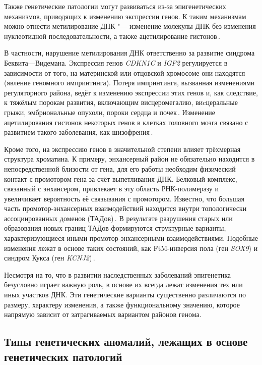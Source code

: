 \documentclass[a4paper,14pt]{extarticle}
\newcommand{\genename}[1]{\textit{#1}}
\newcommand{\ecitep}[1]{\textenglish{\citep{#1}}}
\begin{document}
Также генетические патологии могут развиваться из-за эпигенетических механизмов, приводящих к изменению экспрессии генов.
К таким механизмам можно отнести метилирование ДНК "--- изменение молекулы ДНК без изменения нуклеотидной последовательности, а также ацетилирование гистонов\,\ecitep{Handy_2011}.

В частности, нарушение метилирования ДНК ответственно за развитие синдрома Беквита---Видемана.
Экспрессия генов \genename{CDKN1C} и \genename{IGF2} регулируется в зависимости от того, на материнской или отцовской хромосоме они находятся (явление геномного импринтинга).
Потеря импринтинга, вызванная изменениями регуляторного района, ведёт к изменению экспрессии этих генов и, как следствие, к тяжёлым порокам развития, включающим висцеромегалию, виcцеральные грыжи, эмбриональные опухоли, пороки сердца и почек\,\ecitep{Jin_2018}.
Изменение ацетилирования гистонов некоторых генов в клетках головного мозга связано с развитием такого заболевания, как шизофрения\,\ecitep{Tang_2011}.

Кроме того, на экспрессию генов в значительной степени влияет трёхмерная структура хроматина.
К примеру, энхансерный район не обязательно находится в непосредственной близости от гена, для его работы необходим физический контакт с промотором гена за счёт выпетливания ДНК.
Белковый комплекс, связанный с энхансером, привлекает в эту область РНК-полимеразу и увеличивает вероятность её связывания с промотором.
Известно, что большая часть промотор-энхансерных взаимодействий находится внутри топологически ассоциированных доменов (ТАДов)\,\ecitep{Rao_2014}.
В результате разрушения старых или образования новых границ ТАДов формируются структурные варианты, характеризующиеся иными промотор-энхансерными взаимодействиями.
Подобные изменения лежат в основе таких состояний, как FtM-инверсия пола (ген \genename{SOX9}) и синдром Кукса (ген \genename{KCNJ2})\,\ecitep{Spielmann_2018}.

Несмотря на то, что в развитии наследственных заболеваний эпигенетика безусловно играет важную роль, в основе их всегда лежат изменения тех или иных участков ДНК.
Эти генетические варианты существенно различаются по размеру, характеру изменения, а также функциональному значению, которое напрямую зависит от затрагиваемых вариантом районов генома.

\subsection{Типы генетических аномалий, лежащих в основе генетических патологий}
\end{document}
